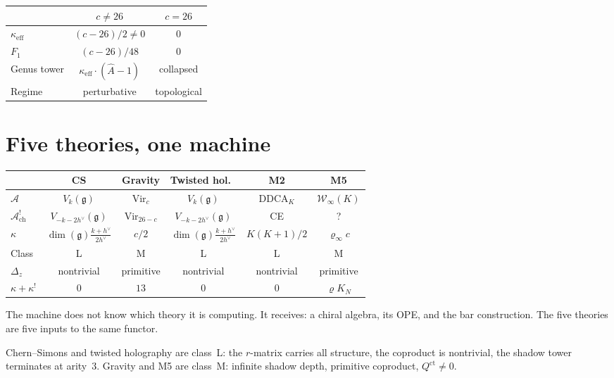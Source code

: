 \documentclass[11pt]{article}
\newcommand{\cA}{\mathcal{A}}
\newcommand{\cW}{\mathcal{W}}
\newcommand{\fg}{\mathfrak{g}}
\begin{document}
\begin{center}
\small
\renewcommand{\arraystretch}{1.15}
\begin{tabular}{@{}lcc@{}}
& $c \neq 26$ & $c = 26$ \\
\hline
$\kappa_{\mathrm{eff}}$ & $(c-26)/2 \neq 0$ & $0$ \\[3pt]
$F_1$ & $(c-26)/48$ & $0$ \\[3pt]
Genus tower & $\kappa_{\mathrm{eff}}\cdot(\hat{A}-1)$ & collapsed \\[3pt]
Regime & perturbative & topological
\end{tabular}
\end{center}


\section{Five theories, one machine}
\label{sec:five-theories}

\begin{center}
\small
\renewcommand{\arraystretch}{1.15}
\begin{tabular}{@{}lccccc@{}}
& CS & Gravity & Twisted hol.\ & M2 & M5 \\
\hline
$\cA$ & $V_k(\fg)$ & $\mathrm{Vir}_c$
  & $V_k(\fg)$ & DDCA$_K$ & $\cW_\infty(K)$ \\[3pt]
$\cA^!_{\mathrm{ch}}$ & $V_{-k-2h^\vee}(\fg)$ & $\mathrm{Vir}_{26-c}$
  & $V_{-k-2h^\vee}(\fg)$ & CE & ? \\[3pt]
$\kappa$ & $\dim(\fg)\frac{k+h^\vee}{2h^\vee}$
  & $c/2$ & $\dim(\fg)\frac{k+h^\vee}{2h^\vee}$
  & $K(K{+}1)/2$ & $\varrho_\infty c$ \\[3pt]
Class & L & M & L & L & M \\[3pt]
$\Delta_z$ & nontrivial & primitive & nontrivial
  & nontrivial & primitive \\[3pt]
$\kappa + \kappa^!$ & $0$ & $13$ & $0$ & $0$
  & $\varrho K_N$
\end{tabular}
\end{center}

\medskip

The machine does not know which theory it is computing.  It
receives: a chiral algebra, its OPE, and the bar construction.
The five theories are five inputs to the same functor.

Chern--Simons and twisted holography are class~L: the $r$-matrix
carries all structure, the coproduct is nontrivial, the shadow
tower terminates at arity~$3$.  Gravity and M5 are class~M:
infinite shadow depth, primitive coproduct,
$Q^{\mathrm{ct}} \neq 0$.
\end{document}
